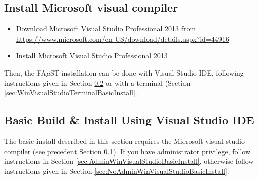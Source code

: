 
\subsection{Install Microsoft visual compiler}\label{sec:WinInstallCompilerVS} 

\begin{itemize}
\item Download Microsoft Visual Studio Professional 2013 from \url{https://www.microsoft.com/en-US/download/details.aspx?id=44916}
\item Install Microsoft Visual Studio Professional 2013
\end{itemize}
Then, the FA$\mu$ST installation can be done with Visual Studio IDE, following instructions given in Section \ref{sec:WinVisualStudioBasicInstall} or with a terminal (Section \ref{sec:WinVisualStudioTerminalBasicInstall}. 

\subsection{Basic Build \& Install Using Visual Studio IDE}\label{sec:WinVisualStudioBasicInstall}
The basic install described in this section requires the Microsoft visual studio compiler (see precedent Section \ref{sec:WinInstallCompilerVS}).
If you have administrator privilege, follow instructions in Section \ref{sec:AdminWinVisualStudioBasicInstall}, otherwise follow instructions given in Section \ref{sec:NoAdminWinVisualStudioBasicInstall}.


